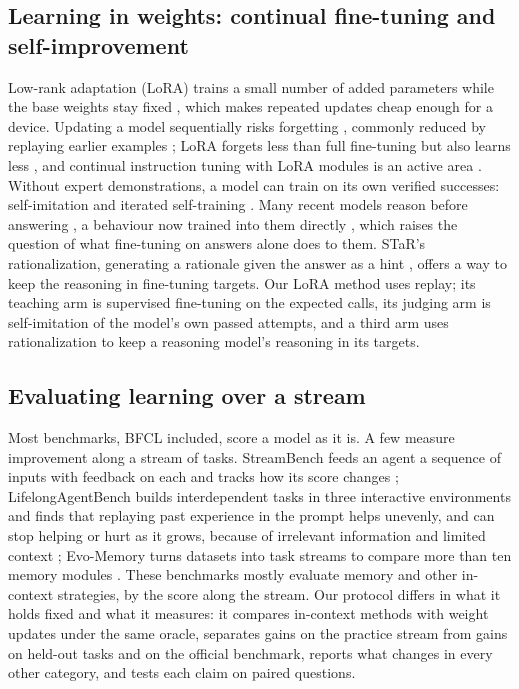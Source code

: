 \documentclass[a4paper,fleqn]{cas-dc}
\begin{document}
\subsection{Learning in weights: continual fine-tuning and self-improvement}\label{sec:rw-weights}
Low-rank adaptation (LoRA) trains a small number of added parameters while the base weights stay fixed
\citep{hu2022lora}, which makes repeated updates cheap enough for a device. Updating a model sequentially risks
forgetting \citep{kirkpatrick2017overcoming,luo2025empirical}, commonly reduced by replaying earlier examples
\citep{rolnick2019experience}; LoRA forgets less than full fine-tuning but also learns less \citep{biderman2024lora}, and
continual instruction tuning with LoRA modules is an active area \citep{jin2025multi,shi2025continual}. Without expert
demonstrations, a model can train on its own verified successes: self-imitation \citep{oh2018self} and iterated self-training
\citep{zelikman2022star,singh2024beyond}. Many recent models reason before answering \citep{wei2022chain}, a behaviour
now trained into them directly \citep{guo2025deepseek,yang2025qwen3}, which raises the question of what fine-tuning on
answers alone does to them. STaR's rationalization, generating a rationale given the answer as a hint
\citep{zelikman2022star}, offers a way to keep the reasoning in fine-tuning targets. Our
LoRA method uses replay; its teaching arm is supervised fine-tuning on the expected calls, its judging arm is
self-imitation of the model's own passed attempts, and a third arm uses rationalization to keep a reasoning model's
reasoning in its targets.

\subsection{Evaluating learning over a stream}\label{sec:rw-eval}
Most benchmarks, BFCL included, score a model as it is. A few measure improvement along a stream of tasks. StreamBench
feeds an agent a sequence of inputs with feedback on each and tracks how its score changes \citep{wu2024streambench};
LifelongAgentBench builds interdependent tasks in three interactive environments and finds that replaying past experience in the prompt helps unevenly, and can stop helping or hurt as it grows,
because of irrelevant information and limited context
\citep{zheng2025lifelongagentbench}; Evo-Memory turns datasets into task streams to compare more than ten memory modules
\citep{wei2025evomemory}. These benchmarks mostly evaluate memory and other in-context strategies, by the score along
the stream. Our protocol differs in what it holds fixed and what it measures: it compares in-context methods with weight
updates under the same oracle, separates gains on the practice stream from gains on held-out tasks and on the official
benchmark, reports what changes in every other category, and tests each claim on paired questions.
\end{document}

